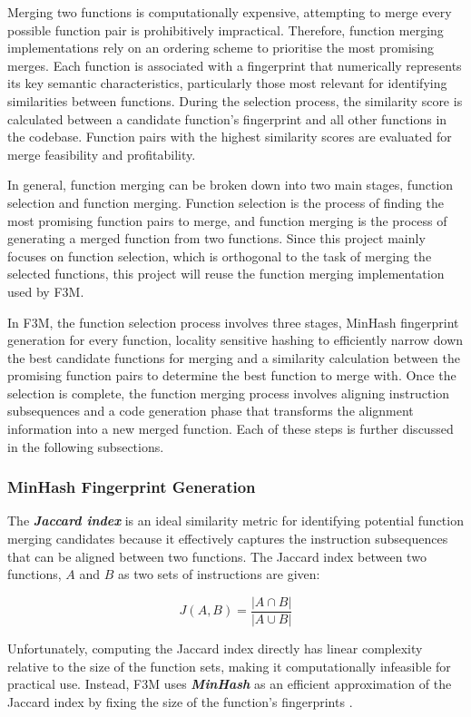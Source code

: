 Merging two functions is computationally expensive, attempting to merge every possible function pair is prohibitively impractical. Therefore, function merging implementations rely on an ordering scheme to prioritise the most promising merges. Each function is associated with a fingerprint that numerically represents its key semantic characteristics, particularly those most relevant for identifying similarities between functions. During the selection process, the similarity score is calculated between a candidate function's fingerprint and all other functions in the codebase. Function pairs with the highest similarity scores are evaluated for merge feasibility and profitability.

In general, function merging can be broken down into two main stages, function selection and function merging. Function selection is the process of finding the most promising function pairs to merge, and function merging is the process of generating a merged function from two functions. Since this project mainly focuses on function selection, which is orthogonal to the task of merging the selected functions, this project will reuse the function merging implementation used by F3M.

In F3M, the function selection process involves three stages, MinHash fingerprint generation for every function, locality sensitive hashing to efficiently narrow down the best candidate functions for merging and a similarity calculation between the promising function pairs to determine the best function to merge with. Once the selection is complete, the function merging process involves aligning instruction subsequences and a code generation phase that transforms the alignment information into a new merged function. Each of these steps is further discussed in the following subsections.

\subsubsection{MinHash Fingerprint Generation} \label{METRIC: MinHashFingerprint}
The \textbf{\textit{Jaccard index}} is an ideal similarity metric for identifying potential function merging candidates because it effectively captures the instruction subsequences that can be aligned between two functions. The Jaccard index between two functions, $A$ and $B$ as two sets of instructions are given:

$$J(A, B) = \frac{|A\cap B|}{|A\cup B|}$$

Unfortunately, computing the Jaccard index directly has linear complexity relative to the size of the function sets, making it computationally infeasible for practical use. Instead, F3M uses \textbf{\textit{MinHash}} as an efficient approximation of the Jaccard index by fixing the size of the function's fingerprints \cite{F3M:MinHash}.

